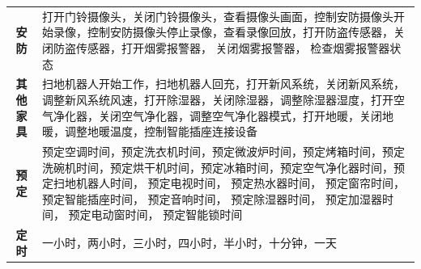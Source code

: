 \documentclass[lang=cn,cite=super]{elegantpaper}
\begin{document}
\begin{table}[H]
\begin{tabularx}{\linewidth}{cX}
        \textbf{安防} & 打开门铃摄像头，关闭门铃摄像头，查看摄像头画面，控制安防摄像头开始录像，控制安防摄像头停止录像，查看录像回放，打开防盗传感器，关闭防盗传感器，打开烟雾报警器， 关闭烟雾报警器， 检查烟雾报警器状态\\
        \textbf{其他家具} & 扫地机器人开始工作，扫地机器人回充，打开新风系统，关闭新风系统，调整新风系统风速，打开除湿器，关闭除湿器，调整除湿器湿度，打开空气净化器，关闭空气净化器，调整空气净化器模式，打开地暖，关闭地暖，调整地暖温度，控制智能插座连接设备\\
        \textbf{预定} & 预定空调时间，预定洗衣机时间，预定微波炉时间，预定烤箱时间，预定洗碗机时间，预定烘干机时间，预定冰箱时间，预定空气净化器时间，预定扫地机器人时间， 预定电视时间， 预定热水器时间， 预定窗帘时间， 预定智能插座时间， 预定音响时间， 预定除湿器时间， 预定加湿器时间， 预定电动窗时间， 预定智能锁时间\\
        \textbf{定时} & 一小时，两小时，三小时，四小时，半小时，十分钟，一天\\
        \bottomrule
    \end{tabularx}
\end{table}
\end{document}
